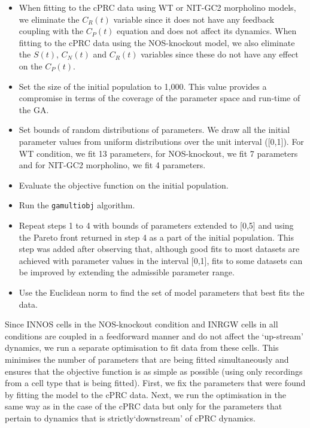 \documentclass[
  10pt,
  onecolumn]{article}
\providecommand{\tightlist}{%
  \setlength{\itemsep}{0pt}\setlength{\parskip}{0pt}}
\begin{document}
\begin{itemize}
\tightlist
\item
  When fitting to the cPRC data using WT or NIT-GC2 morpholino models,
  we eliminate the \(C_R(t)\) variable since it does not have any
  feedback coupling with the \(C_P(t)\) equation and does not affect its
  dynamics. When fitting to the cPRC data using the NOS-knockout model,
  we also eliminate the \(S(t)\), \(C_N(t)\) and \(C_R(t)\) variables
  since these do not have any effect on the \(C_P(t)\).
\item
  Set the size of the initial population to 1,000. This value provides a
  compromise in terms of the coverage of the parameter space and
  run-time of the GA.
\item
  Set bounds of random distributions of parameters. We draw all the
  initial parameter values from uniform distributions over the unit
  interval ({[}0,1{]}). For WT condition, we fit 13 parameters, for
  NOS-knockout, we fit 7 parameters and for NIT-GC2 morpholino, we fit 4
  parameters.
\item
  Evaluate the objective function on the initial population.
\item
  Run the \texttt{gamultiobj} algorithm.
\item
  Repeat steps 1 to 4 with bounds of parameters extended to {[}0,5{]}
  and using the Pareto front returned in step 4 as a part of the initial
  population. This step was added after observing that, although good
  fits to most datasets are achieved with parameter values in the
  interval {[}0,1{]}, fits to some datasets can be improved by extending
  the admissible parameter range.
\item
  Use the Euclidean norm to find the set of model parameters that best
  fits the data.
\end{itemize}

Since INNOS cells in the NOS-knockout condition and INRGW cells in all
conditions are coupled in a feedforward manner and do not affect the
`up-stream' dynamics, we run a separate optimisation to fit data from
these cells. This minimises the number of parameters that are being
fitted simultaneously and ensures that the objective function is as
simple as possible (using only recordings from a cell type that is being
fitted). First, we fix the parameters that were found by fitting the
model to the cPRC data. Next, we run the optimisation in the same way as
in the case of the cPRC data but only for the parameters that pertain to
dynamics that is strictly`downstream' of cPRC dynamics.
\end{document}
